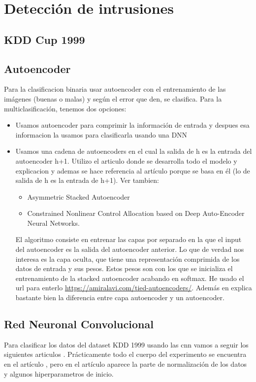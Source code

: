 \chapter{Detección de intrusiones} 
\section{KDD Cup 1999}
\section{Autoencoder}
Para la clasificacion binaria usar autoencoder con el entrenamiento de las imágenes (buenas o malas) y según el error que den, se clasifica.
Para la multiclasificación, tenemos dos opciones:
\begin{itemize}
\item Usamos autoencoder para comprimir la información de entrada y despues esa informacion la usamos para clasificarla usando una DNN \citep{lopes2022effective}
\item Usamos una cadena de autoencoders en el cual la salida de h es la entrada del autoencoder h+1. Utilizo el articulo \citep{farahnakian2018deep} donde se desarrolla todo el modelo y explicacion y ademas se hace referencia al artículo \citep{bengio2006greedy} porque se basa en él (lo de salida de h es la entrada de h+1). Ver tambien:
\begin{itemize}
\item Asymmetric Stacked Autoencoder
\item Constrained Nonlinear Control Allocation based on Deep Auto-Encoder Neural Networks.

\end{itemize} El algoritmo consiste en entrenar las capas por separado en la que el input del autoencoder es la salida del autoencoder anterior. Lo que de verdad nos interesa es la capa oculta, que tiene una representación comprimida de los datos de entrada y sus pesos. Estos pesos son con los que se inicializa el entrenamiento de la stacked autoencoder acabando en softmax. He usado el url para enterlo \url{https://amiralavi.com/tied-autoencoders/}. Además en \citep{bao2017deep} explica bastante bien la diferencia entre capa autoencoder y un autoencoder.
\end{itemize}


\section{Red Neuronal Convolucional}
Para clasificar los datos del dataset KDD 1999 usando las \gls{cnn} vamos a seguir los siguientes articulos \citep{kim2020cnn, yang2006anomaly, nguyen2018design, kim2018encoding}. Prácticamente todo el cuerpo del experimento se encuentra en el artículo \citep{kim2020cnn}, pero en el artículo \citep{kim2018encoding} aparece la parte de normalización de los datos y algunos hiperparametros de inicio.


